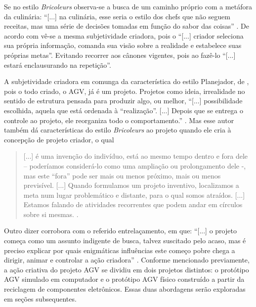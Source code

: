 \documentclass[portuguese]{textolivre}
\begin{document}
Se no estilo \emph{Bricoleurs} observa-se a busca de um caminho próprio com a metáfora da culinária: “[...] na culinária, esse seria o estilo dos chefs que não seguem receitas, mas uma série de decisões tomadas em função do sabor das coisas” \cite[p. 7]{Papert1992}. De acordo com \textcite[p.163]{Marina2009} vê-se a mesma subjetividade criadora, pois o “[...] criador seleciona sua própria informação, comanda sua visão sobre a realidade e estabelece suas próprias metas”. Evitando recorrer aos cânones vigentes, pois ao fazê-lo “[...] estará enclausurando na repetição”.

A subjetividade criadora em \textcite{Marina2009} comunga da característica do estilo Planejador, de \textcite{Papert1992}, pois o todo criado, o AGV, já é um projeto. Projetos como ideia, irrealidade no sentido de estrutura pensada para produzir algo, ou melhor, “[...] possibilidade escolhida, aquela que está ordenada à “realização”. [...] Depois que se entrega o controle ao projeto, ele reorganiza todo o comportamento.” \cite[p. 117]{Marina2009}. Mas esse autor também dá características do estilo \emph{Bricoleurs} ao projeto quando ele cria à concepção de projeto criador, o qual

\begin{quote}
[...] é uma invenção do indivíduo, está ao mesmo tempo dentro e fora dele – poderíamos considerá-lo como uma ampliação ou prolongamento dele -, mas este “fora” pode ser mais ou menos próximo, mais ou menos previsível. [...] Quando formulamos um projeto inventivo, localizamos a meta num lugar problemático e distante, para o qual somos atraídos. [...] Estamos falando de atividades recorrentes que podem andar em círculos sobre si mesmas. \cite[p. 119]{Marina2009}.
\end{quote}

Outro dizer corrobora com o referido entrelaçamento, em que: “[...] o projeto começa como um assunto indigente de busca, talvez suscitado pelo acaso, mas é preciso explicar por quais enigmáticas influências este começo pobre chega a dirigir, animar e controlar a ação criadora” \cite[p. 122]{Marina2009}. Conforme mencionado previamente, a ação criativa do projeto AGV se dividiu em dois projetos distintos: o protótipo AGV simulado em computador e o protótipo AGV físico construído a partir da reciclagem de componentes eletrônicos. Essas duas abordagens serão exploradas em seções subsequentes.
\end{document}
